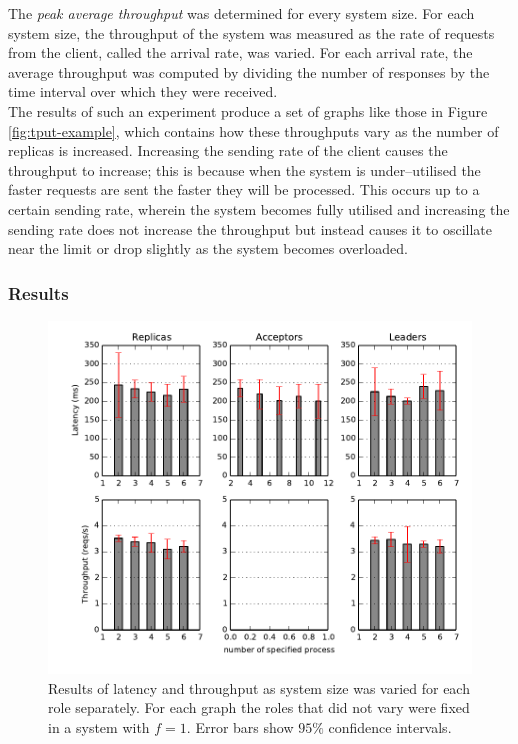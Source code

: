 The \emph{peak average throughput} was determined for every system size. For each system size, the throughput of the system was measured as the rate of requests from the client, called the arrival rate, was varied. For each arrival rate, the average throughput was computed by dividing the number of responses by the time interval over which they were received. \\

The results of such an experiment produce a set of graphs like those in Figure \ref{fig:tput-example}, which contains how these throughputs vary as the number of replicas is increased. Increasing the sending rate of the client causes the throughput to increase; this is because when the system is under--utilised the faster requests are sent the faster they will be processed. This occurs up to a certain sending rate, wherein the system becomes fully utilised and increasing the sending rate does not increase the throughput but instead causes it to oscillate near the limit or drop slightly as the system becomes overloaded.

\subsubsection{Results}

\begin{figure}[t]
  \centering
  \includegraphics{include/system-size-roles.pdf}
  \caption{Results of latency and throughput as system size was varied for each role separately. For each graph the roles that did not vary were fixed in a system with $f=1$. Error bars show $95\%$ confidence intervals.}
  \label{fig:system-size-roles}
\end{figure}

